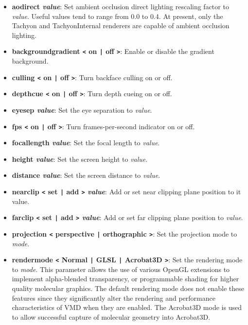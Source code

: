 \begin{itemize}
\item {\bf  aodirect {\it value}}:
    Set ambient occlusion direct lighting rescaling factor to {\it value}.
    Useful values tend to range from 0.0 to 0.4. 
    At present, only the Tachyon and TachyonInternal renderers are capable
    of ambient occlusion lighting.

\item {\bf backgroundgradient {\tt <}  on {\tt |} off {\tt >}}: 
  Enable or disable the gradient background. 

\item {\bf  culling {\tt <}  on {\tt |} off {\tt >}}: Turn backface culling on or off.
\item {\bf  depthcue {\tt <}  on {\tt |} off {\tt >}}: Turn depth cueing on or off.

\item {\bf  eyesep {\it value}}: Set the eye separation to {\it value}.

\item {\bf  fps {\tt <}  on {\tt |} off {\tt >}}: Turn frames-per-second
  indicator on or off.

\item {\bf  focallength {\it value}}: Set the focal length to {\it value}.
\item {\bf  height {\it value}}: Set the screen height to {\it value}.
\item {\bf  distance {\it value}}: Set the screen distance to {\it value}.

\item {\bf  nearclip {\tt <}  set {\tt |} add {\tt >}  {\it value}}: Add or set near clipping plane position to {it value}.
\item {\bf  farclip {\tt <}  set {\tt |} add {\tt >}  {\it value}}: Add or set far clipping plane position to {\it value}.

\item {\bf  projection {\tt <} perspective {\tt |} orthographic {\tt >}}: Set the projection mode to {\it mode}.


\item {\bf  rendermode {\tt <} Normal {\tt |} GLSL {\tt |} Acrobat3D {\tt >}}:
   Set the rendering mode to {\it mode}.
   This parameter allows the use of various OpenGL extensions to implement 
   alpha-blended transparency, or programmable shading for higher quality
   molecular graphics.  The default rendering mode does not enable these 
   features since they significantly alter the rendering and performance
   characteristics of VMD when they are enabled.  The Acrobat3D mode is
   used to allow successful capture of molecular geometry into Acrobat3D.


\end{itemize}
